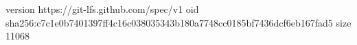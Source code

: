 version https://git-lfs.github.com/spec/v1
oid sha256:c7c1e0b7401397ff4c16c038035343b180a7748cc0185bf7436dcf6eb167fad5
size 11068
